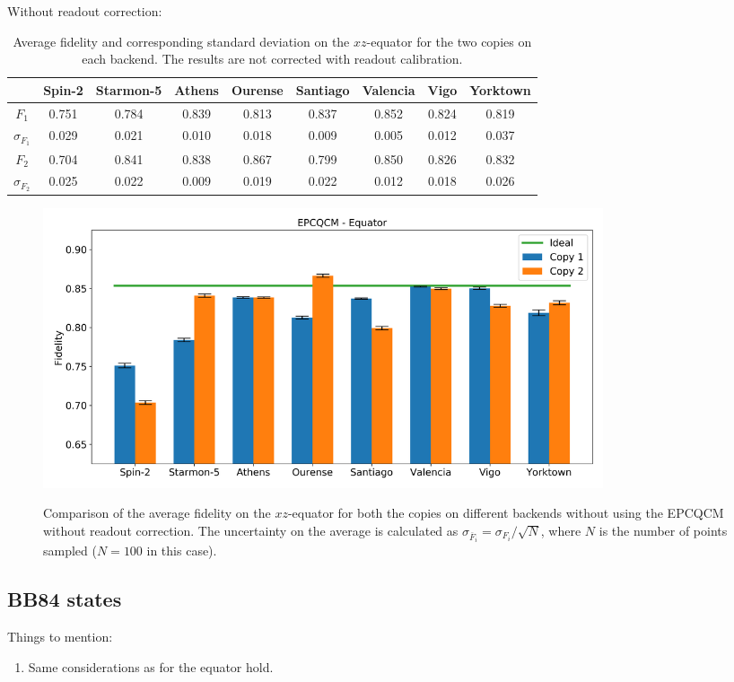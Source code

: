 Without readout correction:
\begin{table}[H]
    \centering
    \begin{tabular}{|c|c|c|c|c|c|c|c|c|}
    \hline
    \textbf{} & \textbf{Spin-2} & \textbf{Starmon-5} & \textbf{Athens} & \textbf{Ourense} & \textbf{Santiago} & \textbf{Valencia} & \textbf{Vigo} & \textbf{Yorktown} \\ \hline
    $F_1$              & 0.751  & 0.784 & 0.839 & 0.813 & 0.837 & 0.852 & 0.824 & 0.819 \\ \hline
    $\sigma_{F_1}$     & 0.029  & 0.021 & 0.010 & 0.018 & 0.009 & 0.005 & 0.012 & 0.037 \\ \hline
    $F_2$              & 0.704  & 0.841 & 0.838 & 0.867 & 0.799 & 0.850 & 0.826 & 0.832 \\ \hline
    $\sigma_{F_2}$     & 0.025  & 0.022 & 0.009 & 0.019 & 0.022 & 0.012 & 0.018 & 0.026 \\ \hline
    \end{tabular}
    \caption{Average fidelity and corresponding standard deviation on the $xz$-equator for the two copies on each backend. The results are not corrected with readout calibration.}
\end{table}
\begin{figure}[H]
  \centering
          \includegraphics[width=0.8\textwidth]{Figures/Economical/Histograms/histo_equator.png}
      \label{fig:epc_histo_equator_not_corrected}
      \caption{Comparison of the average fidelity on the $xz$-equator for both the copies on different backends without using the EPCQCM without readout correction. The uncertainty on the average is calculated as $\sigma_{\overline{F}_i}=\sigma_{F_i}/\sqrt{N}$, where $N$ is the number of points sampled ($N=100$ in this case).}
\end{figure}

\subsection{BB84 states}
Things to mention:
\begin{enumerate}
  \item Same considerations as for the equator hold.
\end{enumerate} 

